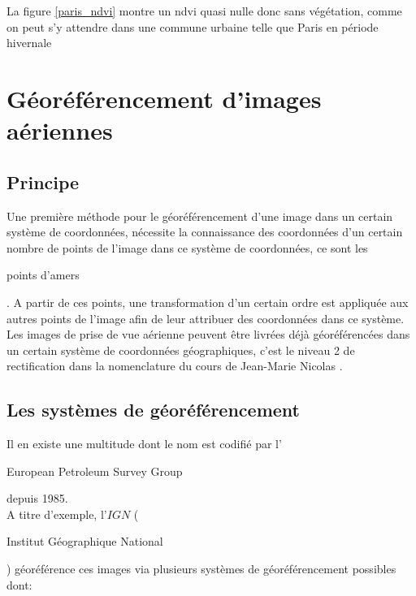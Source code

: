 \documentclass{book}
\begin{document}
La figure \ref{paris_ndvi} montre un ndvi quasi nulle donc sans végétation, comme on peut s'y attendre dans une commune urbaine telle que Paris en période hivernale\\

\clearpage


\chapter{Géoréférencement d'images aériennes}
\section{Principe}\label{principe_geo}

Une première méthode pour le géoréférencement d'une image dans un certain système de coordonnées, nécessite la connaissance 
des coordonnées d'un 
certain nombre de points de l'image dans ce système de coordonnées, ce sont les \begin{itshape}points d'amers\end{itshape}.
A partir de ces points, une transformation d'un certain ordre est appliquée aux autres points de l'image afin de leur attribuer 
des coordonnées dans ce système.\\
Les images de prise de vue aérienne peuvent être livrées déjà géoréférencées dans un certain système de coordonnées géographiques, 
c'est le niveau 2 de rectification dans la nomenclature du cours de Jean-Marie Nicolas \cite{Nicolas:2014}.\\

\section{Les systèmes de géoréférencement}

Il en existe une multitude dont le nom est codifié par l'\begin{itshape}European Petroleum Survey Group\end{itshape} depuis 1985.\\
A titre d'exemple, l'$IGN$ (\begin{itshape}Institut Géographique National\end{itshape}) géoréférence ces images via plusieurs
systèmes de géoréférencement possibles dont:\\
\end{document}
